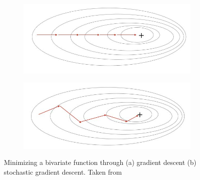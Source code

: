 \begin{figure}[htb!]
\centering
\begin{subfigure}[t]{0.475\textwidth}
    \centering
    \includegraphics[width=\textwidth]{images/gd}
    \caption{}
\end{subfigure}
\hfill
\begin{subfigure}[t]{0.475\textwidth}
    \centering
    \includegraphics[width=\textwidth]{images/sgd}
    \caption{}
\end{subfigure}
\caption[Minimizing a function through GD and SGD]{Minimizing a bivariate function through (a) gradient descent (b) stochastic gradient descent. Taken from \cite{gd_images}}
\label{fig:gd_vs_sgd}
\end{figure}

